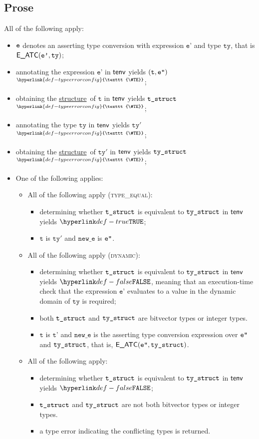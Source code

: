 \documentclass{book}
\newcommand\TypeErrorConfig[0]{\hyperlink{def-typeerrorconfig}{\texttt{\#TE}}}
\newcommand\ProseOrTypeError[0]{\hyperlink{def-proseortypeerror}{$^{\TypeErrorConfig}$}}
\newcommand\structure[0]{\hyperlink{def-structure}{structure}}
\newcommand\vt[0]{\texttt{t}}
\newcommand\tty[0]{\texttt{ty}}
\newcommand\newe[0]{\texttt{new\_e}}
\newcommand\vep[0]{\texttt{e'}}
\newcommand\vtp[0]{\texttt{t'}}
\begin{document}
\subsection{Prose}
All of the following apply:
\begin{itemize}
  \item $\texttt{e}$ denotes an asserting type conversion with expression $\vep$ and type $\tty$, that is $\EATC(\vep, \tty)$;
  \item annotating the expression $\vep$ in $\textsf{tenv}$ yields $(\vt, \vepp)$ \ProseOrTypeError;
  \item obtaining the \structure\ of $\vt$ in $\textsf{tenv}$ yields $\texttt{t\_struct}$ \ProseOrTypeError;
  \item annotating the type $\tty$ in $\textsf{tenv}$ yields $\tty'$ \ProseOrTypeError;
  \item obtaining the \structure\ of $\tty'$ in $\textsf{tenv}$ yields $\texttt{ty\_struct}$ \ProseOrTypeError;
  \item One of the following applies:
  \begin{itemize}
  \item All of the following apply (\textsc{type\_equal}):
  \begin{itemize}
    \item determining whether $\texttt{t\_struct}$ is equivalent to $\texttt{ty\_struct}$ in $\textsf{tenv}$ \\ yields $\True$;
    \item $\vt$ is $\tty'$ and $\newe$ is $\texttt{e''}$.
  \end{itemize}
  \item All of the following apply (\textsc{dynamic}):
    \begin{itemize}
      \item determining whether $\texttt{t\_struct}$ is equivalent to $\texttt{ty\_struct}$ in $\textsf{tenv}$ \\ yields $\False$,
      meaning that an execution-time check that the expression $\vep$ evaluates to a value in the
      dynamic domain of $\tty$ is required;
      \item both $\texttt{t\_struct}$ and $\texttt{ty\_struct}$ are bitvector types or integer types.
      \item $\vt$ is $\vtp$ and $\newe$ is the asserting type conversion expression over $\texttt{e''}$ \\ and
      $\texttt{ty\_struct}$, that is, $\textsf{E\_ATC}(\texttt{e''}, \texttt{ty\_struct})$.
    \end{itemize}
  \item All of the following apply:
    \begin{itemize}
    \item determining whether $\texttt{t\_struct}$ is equivalent to $\texttt{ty\_struct}$ in $\textsf{tenv}$ \\ yields $\False$;
    \item $\texttt{t\_struct}$ and $\texttt{ty\_struct}$ are not both bitvector types or integer types.
    \item a type error indicating the conflicting types is returned.
    \end{itemize}
  \end{itemize}
\end{itemize}
\end{document}
